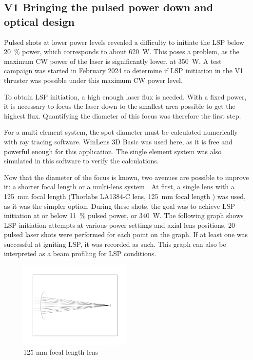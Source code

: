     

        \subsection{V1 Bringing the pulsed power down and optical design} \label{sec:pulse_power_down_V1}

            Pulsed shots at lower power levels revealed a difficulty to initiate the LSP below \qty{20}{\%} power, which corresponds to about \qty{620}{W}. This poses a problem, as the maximum CW power of the laser is significantly lower, at \qty{350}{W}. A test campaign was started in February 2024 to determine if LSP initiation in the V1 thruster was possible under this maximum CW power level.
            
            To obtain LSP initiation, a high enough laser flux is needed. With a fixed power, it is necessary to focus the laser down to the smallest area possible to get the highest flux. Quantifying the diameter of this focus was therefore the first step. 


            For a multi-element system, the spot diameter must be calculated numerically with ray tracing software. WinLens 3D Basic was used here, as it is free and powerful enough for this application. The single element system was also simulated in this software to verify the calculations.

            Now that the diameter of the focus is known, two avenues are possible to improve it: a shorter focal length or a multi-lens system \cite{LensTutorial}. At first, a single lens with a \qty{125}{mm} focal length (Thorlabs LA1384-C lens, \qty{125}{mm} focal length ) was used, as it was the simpler option. During these shots, the goal was to achieve LSP initiation at or below \qty{11}{\%} pulsed power, or \qty{340}{W}. The following graph shows LSP initiation attempts at various power settings and axial lens positions. 20 pulsed laser shots were performed for each point on the graph. If at least one was successful at igniting LSP, it was recorded as such. This graph can also be interpreted as a beam profiling for LSP conditions.
            
            \begin{figure}[!ht]
                \centering
                \includegraphics[width=0.5\textwidth]{assets/4 experiments/125lens.pdf}
                \caption{125 mm focal length lens}
            \end{figure}

